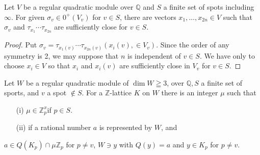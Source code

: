 \setcounter{lemma}{29}
\begin{lemma}\label{c2:lem-2.30}
Let $V$ be a regular quadratic module over $\mathbb{Q}$ and $S$ a
finite set of spots including $\infty$. For given
$\sigma_v \in 0^+(V_v)$ for $v\in S$, there are
vectors $x_1, \ldots, x_{2n} \in V$ such that $\sigma_v$ and
$\tau_{x_1} \cdots \tau_{x_{2n}}$ are sufficiently close for
$v\in S$. 
\end{lemma}

\begin{proof}
Put $\sigma_v= \tau_{x_1(v)} \cdots \tau_{x_{2n}(v)}
(x_i(v), \in V_v)$. Since the order of any symmetry is 2, we
may suppose that $n$ is independent of $v\in S$. We have only
to choose $x_i \in V$ so that $x_i$ and $x_i(v)$ are
sufficiently close in $V_v$ for $v\in S$.
\end{proof}

\begin{lemma}\label{c2:lem-2.31}
Let $W$ be a regular quadratic module of $\dim 
W \geqq 3$, over $\mathbb{Q}, S$ a finite set of sports, and $v$ a
spot $\not\in S$. For a $\mathbb{Z}$-lattice $K$ on $W$ there
is an integer $\mu$ such that 
\begin{itemize}
\item[\rm{(i)}] $\mu \in \mathbb{Z}^x_p$\pageoriginale if
$p\in S$. 

\item[\rm{(ii)}] if a rational number $a$ is represented by $W$, and 
\end{itemize}
$a\in Q(K_p) \cap \mu \mathbb{Z}_p$ for $p\neq v$, $W\ni y$
with $Q(y)=a$ and $y\in K_p$ for $p\neq v$.
\end{lemma}

